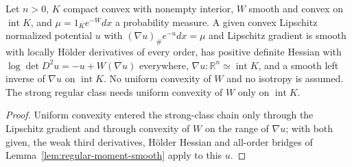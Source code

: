 \begin{lemma}
  \label{lem:moment-potential-smooth-given-gradient}
  \leanok
  Let $n>0$, $K$ compact convex with nonempty interior, $W$ smooth and convex on
  $\operatorname{int}K$, and $\mu=1_K e^{-W}dx$ a probability measure. A given convex Lipschitz
  normalized potential $u$ with $(\nabla u)_\#e^{-u}dx=\mu$ and Lipschitz gradient is smooth with locally
  H\"older derivatives of every order, has positive definite Hessian with
  $\log\det D^2u=-u+W(\nabla u)$ everywhere, $\nabla u:\mathbb R^n\simeq\operatorname{int}K$, and a
  smooth left inverse of $\nabla u$ on $\operatorname{int}K$. No uniform convexity of $W$ and no isotropy
  is assumed. The strong regular class needs uniform convexity of $W$ only on $\operatorname{int}K$.
\end{lemma}
\begin{proof}
  \leanok
  Uniform convexity entered the strong-class chain only through the Lipschitz gradient and through
  convexity of $W$ on the range of $\nabla u$; with both given, the weak third derivatives,
  H\"older Hessian and all-order bridges of Lemma~\ref{lem:regular-moment-smooth} apply to this $u$.
\end{proof}

